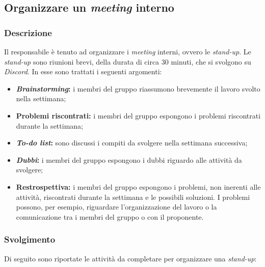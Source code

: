 \subsection{Organizzare un \textit{meeting} interno}
\label{organizzare-meeting-interno}

\subsubsection{Descrizione}
Il responsabile è tenuto ad organizzare i \textit{meeting} interni, ovvero le
\textit{stand-up}. Le \textit{stand-up} sono riunioni brevi, della durata di
circa 30 minuti, che si svolgono su \textit{Discord}. In esse sono trattati i
seguenti argomenti:
\begin{itemize}
	\item \textbf{\textit{Brainstorming}:} i membri del gruppo riassumono
	      brevemente il lavoro svolto nella settimana;

	\item \textbf{Problemi riscontrati:} i membri del gruppo espongono i
	      problemi riscontrati durante la settimana;

	\item \textbf{\textit{To-do list}:} sono discussi i compiti da svolgere nella
	      settimana successiva;

	\item \textbf{\textit{Dubbi}:} i membri del gruppo espongono i dubbi
	      riguardo alle attività da svolgere;

	\item \textbf{Restrospettiva:} i membri del gruppo espongono i problemi,
	      non inerenti alle attività, riscontrati durante la settimana e le
	      possibili soluzioni. I problemi possono, per esempio, riguardare
	      l'organizzazione del lavoro o la comunicazione tra i membri del
	      gruppo o con il proponente.
\end{itemize}

\subsubsection{Svolgimento}
Di seguito sono riportate le attività da completare per organizzare una
\textit{stand-up}:

